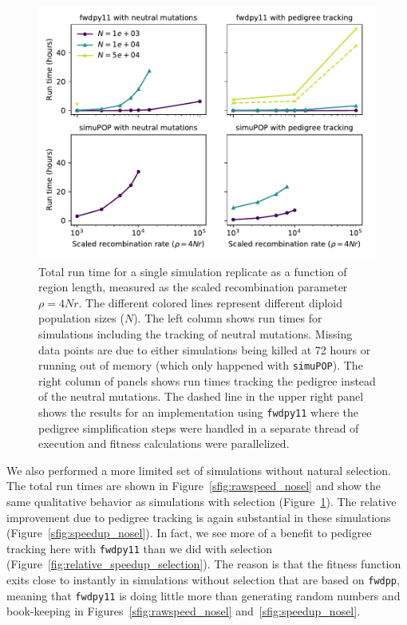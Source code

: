 \documentclass{article}
\newcommand{\simupop}{\texttt{simuPOP}}
\newcommand{\fwdpp}{\texttt{fwdpp}}
\newcommand{\fwdpy}{\texttt{fwdpy11}}
\begin{document}
\begin{figure}
    \includegraphics[]{sims/rawspeed}
    \caption{\label{fig:runtimes_selection}Total run time for a single simulation replicate as a function of region
        length, measured as the scaled recombination parameter $\rho = 4Nr$. The different colored lines represent
        different diploid population sizes ($N$). The left column shows run times for
        simulations including the tracking of neutral mutations.  Missing data points are due to either simulations
    being killed at 72 hours or running out of memory (which only happened with \simupop{}).  The right column of
panels shows run times tracking the pedigree instead of the neutral mutations. The dashed line in the upper right panel shows
the results for an implementation using \fwdpy{} where the pedigree simplification steps were handled in a separate thread of
execution and fitness calculations were parallelized.}
\end{figure}

We also performed a more limited set of simulations without natural selection.  The total run times are shown in
Figure~\ref{sfig:rawspeed_nosel} and show the same qualitative behavior as simulations with selection
(Figure~\ref{fig:runtimes_selection}).  The relative improvement due to pedigree tracking is again substantial in these
simulations (Figure~\ref{sfig:speedup_nosel}).  In fact, we see more of a benefit to pedigree tracking here with \fwdpy{}
than we did with selection (Figure~\ref{fig:relative_speedup_selection}).  The reason is that the fitness function exits
close to instantly in simulations without selection that are based on \fwdpp{}, meaning that \fwdpy{} is doing little
more than generating random numbers and book-keeping in Figures~\ref{sfig:rawspeed_nosel}
and~\ref{sfig:speedup_nosel}.
\end{document}

